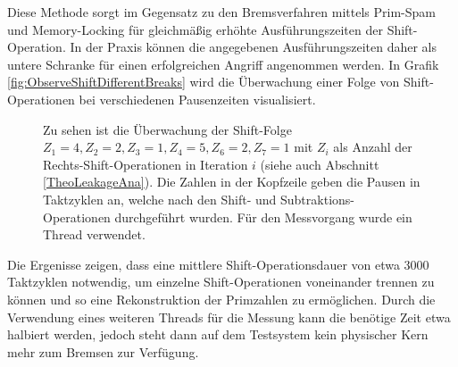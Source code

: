 
Diese Methode sorgt im Gegensatz zu den Bremsverfahren mittels Prim-Spam und Memory-Locking für gleichmäßig erhöhte Ausführungszeiten der Shift-Operation.
In der Praxis können die angegebenen Ausführungszeiten daher als untere Schranke für einen erfolgreichen Angriff angenommen werden.
In Grafik \ref{fig:ObserveShiftDifferentBreaks} wird die Überwachung einer Folge von Shift-Operationen bei verschiedenen Pausenzeiten visualisiert.

\label{fig:ObserveShiftDifferentBreaks}
\begin{figure}[h]
\centering
\begin{scaletikzpicturetowidth}{\textwidth}

\end{scaletikzpicturetowidth}
\caption{Zu sehen ist die Überwachung der Shift-Folge $Z_1=4,Z_2=2,Z_3=1,Z_4=5,Z_6=2,Z_7=1$ mit $Z_i$ als Anzahl der Rechts-Shift-Operationen in Iteration $i$ (siehe auch Abschnitt \ref{TheoLeakageAna}). Die Zahlen in der Kopfzeile geben die Pausen in Taktzyklen an, welche nach den Shift- und Subtraktions-Operationen durchgeführt wurden. Für den Messvorgang wurde ein Thread verwendet.}
\end{figure}

Die Ergenisse zeigen, dass eine mittlere Shift-Operationsdauer von etwa 3000 Taktzyklen notwendig, um einzelne Shift-Operationen voneinander trennen zu können und so eine Rekonstruktion der Primzahlen zu ermöglichen.
Durch die Verwendung eines weiteren Threads für die Messung kann die benötige Zeit etwa halbiert werden, jedoch steht dann auf dem Testsystem kein physischer Kern mehr zum Bremsen zur Verfügung.

